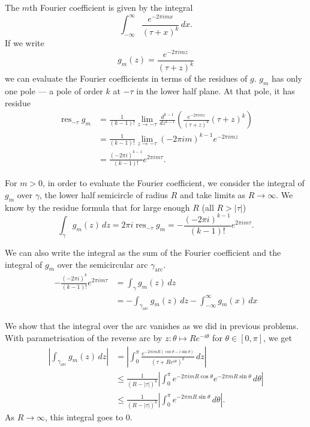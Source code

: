 \documentclass[12 pt, letterpaper]{hmcpset}
\begin{document}
\begin{solution}
	The $m$th Fourier coefficient is given by the integral
	\[
		\int_{-\infty}^{\infty} \frac{e^{-2 \pi i m x}}{(\tau + x)^{k}} \, dx.
	\]
	If we write
	\[
		g_{m}(z) = \frac{e^{- 2 \pi i m z}}{(\tau + z)^{k}}
	\]
	we can evaluate the Fourier coefficients in terms of the residues of $g$. $g_{m}$ has only one pole --- a pole of order $k$ at $- \tau$ in the lower half plane. At that pole, it has residue
	\[
		\begin{split}
			\operatorname{res}_{- \tau} g_{m} & = \frac{1}{(k - 1)!} \lim_{z \to - \tau} \frac{d^{k - 1}}{dz^{k - 1}} \left ( \frac{e^{-2 \pi i m z}}{(\tau + z)^{k}} (\tau + z)^{k} \right ) \\
							  & = \frac{1}{(k - 1)!} \lim_{z \to - \tau} (-2 \pi i m)^{k - 1} e^{-2 \pi i m z} \\
							  & = \frac{(- 2 \pi i)^{k - 1}}{(k - 1)!} e^{2 \pi i m \tau}.
		\end{split}
	\]

	For $m > 0$, in order to evaluate the Fourier coefficient, we consider the integral of $g_{m}$ over $\gamma$, the lower half semicircle of radius $R$ and take limits as $R \to \infty$. We know by the residue formula that for large enough $R$ (all $R > \lvert \tau \rvert$)
	\[
		\int_{\gamma} g_{m}(z) \, dz = 2 \pi i \operatorname{res}_{- \tau} g_{m} = - \frac{(- 2 \pi i)^{k - 1}}{(k - 1)!} e^{2 \pi i m \tau}.
	\]
	
	We can also write the integral as the sum of the Fourier coefficient and the integral of $g_{m}$ over the semicircular arc $\gamma_{\text{arc}}$.
	\[
		\begin{split}
			- \frac{(- 2 \pi i )^{k}}{(k - 1)!} e^{2 \pi i m \tau} & =  \int_{\gamma} g_{m}(z) \, dz \\
									       & = - \int_{\gamma_{\text{arc}}} g_{m}(z) \, dz - \int_{-\infty}^{\infty} g_{m}(x) \, dx
		\end{split}
	\]

	We show that the integral over the arc vanishes as we did in previous problems. With parametrisation of the reverse arc by $z : \theta \mapsto R e^{- i \theta}$ for $\theta \in [0, \pi]$, we get
	\[
		\begin{split}
			\left \lvert \int_{\gamma_{\text{arc}}} g_{m}(z) \, dz \right \rvert & = \left \lvert \int_{0}^{\pi} \frac{e^{- 2 \pi i m R(\cos{\theta} - i \sin{\theta})}}{(\tau + R e^{i \theta})^{k}} \, dz \right \rvert \\
											     & \le \frac{1}{(R - \lvert \tau \rvert)^{k}} \left \lvert \int_{0}^{\pi} e^{-2 \pi i m R \cos{\theta}} e^{- 2 \pi m R \sin{\theta}} \, d\theta  \right \rvert \\
											     & \le \frac{1}{(R - \lvert \tau \rvert)^{k}} \left \lvert \int_{0}^{\pi} e^{- 2 \pi m R \sin{\theta}} \, d \theta \right \rvert.
		\end{split}
	\]
	As $R \to \infty$, this integral goes to $0$.


\end{solution}
\end{document}
